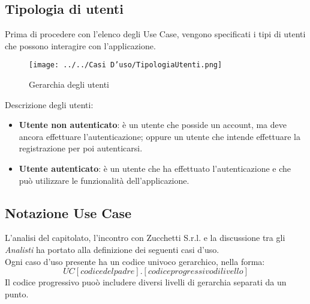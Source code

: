\subsection{Tipologia di utenti}
Prima di procedere con l’elenco degli Use Case, vengono specificati i tipi di utenti che possono interagire con l'applicazione.
\begin{figure}[h!] 
\centering 
\texttt{[image: ../../Casi D'uso/TipologiaUtenti.png]} 
\caption{Gerarchia degli utenti} 
 \end{figure} 
 
 Descrizione degli utenti:
 
 \begin{itemize}
 \item \textbf{Utente non autenticato}: è un utente che posside un account, ma deve ancora effettuare l'autenticazione; oppure un utente che intende effettuare la registrazione per poi autenticarsi.
 \item \textbf{Utente autenticato}: è un utente che ha effettuato l'autenticazione e che può utilizzare le funzionalità dell'applicazione.
 \end{itemize}
 
\subsection{Notazione Use Case}
L'analisi del capitolato, l'incontro con Zucchetti S.r.l. e la discussione tra gli \emph{Analisti} ha portato alla definizione dei seguenti casi d'uso.\\
Ogni caso d’uso presente ha un codice univoco gerarchico, nella forma:
\[UC[codice del padre].[codice progressivo di livello]\]
Il codice progressivo puoò includere diversi livelli di gerarchia separati da un punto.

\newpage
